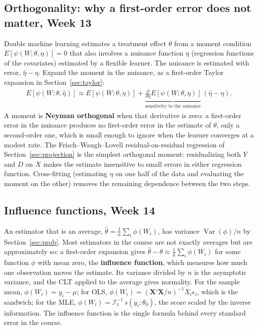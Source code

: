 \documentclass[11pt]{article}
\theoremstyle{definition}
\DeclareMathOperator{\Var}{Var}
\newcommand{\E}{E}
\newcommand{\Info}{\mathcal{I}}
\newcommand{\X}{\bm{X}}
\begin{document}
\subsection{Orthogonality: why a first-order error does not matter, Week 13}

Double machine learning estimates a treatment effect $\theta$ from a
moment condition $\E[\psi(W; \theta, \eta)] = 0$ that also involves a
nuisance function $\eta$ (regression functions of the covariates)
estimated by a flexible learner. The nuisance is estimated with error,
$\hat\eta - \eta$. Expand the moment in the nuisance, as a first-order
Taylor expansion in Section~\ref{sec:taylor}:
\begin{align*}
  \E[\psi(W; \theta, \hat\eta)] \approx \E[\psi(W; \theta, \eta)]
  + \underbrace{\frac{\partial}{\partial\eta}\E[\psi(W; \theta, \eta)]}_{\text{sensitivity to the nuisance}}\,(\hat\eta - \eta).
\end{align*}
A moment is \textbf{Neyman orthogonal} when that derivative is zero: a
first-order error in the nuisance produces no first-order error in the
estimate of $\theta$, only a second-order one, which is small enough to
ignore when the learner converges at a modest rate. The
Frisch--Waugh--Lovell residual-on-residual regression of
Section~\ref{sec:projection} is the simplest orthogonal moment: residualizing
both $Y$ and $D$ on $X$ makes the estimate insensitive to small errors in
either regression function. Cross-fitting (estimating $\eta$ on one half
of the data and evaluating the moment on the other) removes the remaining
dependence between the two steps.

\subsection{Influence functions, Week 14}

An estimator that is an average, $\hat\theta = \frac1n\sum_i\phi(W_i)$,
has variance $\Var(\phi)/n$ by Section~\ref{sec:prob}. Most estimators in
the course are not exactly averages but are approximately so: a
first-order expansion gives $\hat\theta - \theta \approx
\frac1n\sum_i\phi(W_i)$ for some function $\phi$ with mean zero, the
\textbf{influence function}, which measures how much one observation moves
the estimate. Its variance divided by $n$ is the asymptotic variance, and
the CLT applied to the average gives normality. For the sample mean,
$\phi(W_i) = y_i - \mu$; for OLS, $\phi(W_i) = (\X'\X/n)^{-1}X_i\epsilon_i$,
which is the sandwich; for the MLE, $\phi(W_i) = \Info_1^{-1}\,s(y_i;
\theta_0)$, the score scaled by the inverse information. The influence
function is the single formula behind every standard error in the course.
\end{document}

